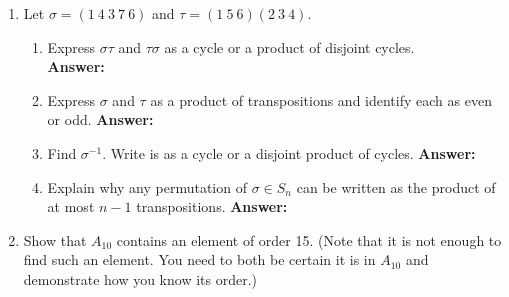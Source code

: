 \documentclass[12pt]{article}
\begin{document}
\begin{enumerate}
\item Let $\sigma=(1 \: 4 \: 3 \: 7\: 6)$ and $\tau=(1\: 5 \: 6)(2 \: 3 \: 4).$
	\begin{enumerate}
	\item Express $\sigma \tau$  and $\tau \sigma$ as a cycle or a product of disjoint cycles. \\
	\textbf{Answer:} \\
	\item Express $\sigma$ and $\tau$ as a product of transpositions and identify each as even or odd.
	\textbf{Answer:} \\
	\item Find $\sigma^{-1}$. Write is as a cycle or a disjoint product of cycles.
	\textbf{Answer:} \\
	\item Explain why any permutation of $\sigma \in S_n$ can be written as the product of at most $n-1$ transpositions.
	\textbf{Answer:} \\
	\end{enumerate}
\newpage
\item Show that $A_{10}$ contains an element of order 15. (Note that it is not enough to find such an element. You need to both be certain it is in $A_{10}$ and demonstrate how you know its order.)
\end{enumerate}
\end{document}
